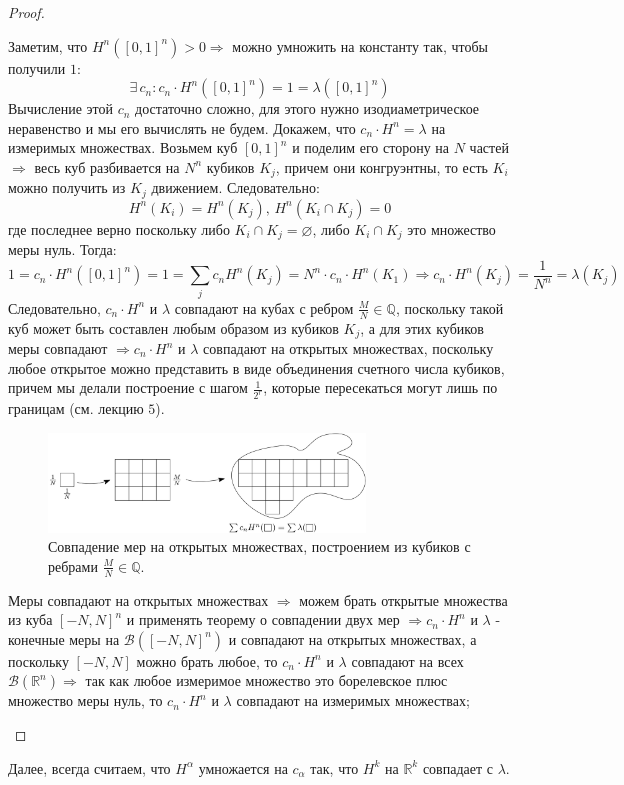 \documentclass[12pt]{article}
\newcommand{\MR}{\mathbb{R}}
\newcommand{\MQ}{\mathbb{Q}}
\newcommand{\MB}{\mathcal{B}}
\newcommand{\VN}{\varnothing}
\theoremstyle{definition}
\newcommand{\ddsum}[2]{\displaystyle\sum\limits_{#1}^{#2}}
\begin{document}
\begin{proof}
\begin{enumerate}[label=\arabic*)]
		Заметим, что $H^n([0,1]^n) > 0 \Rightarrow$ можно умножить на константу так, чтобы получили $1$:
		$$
			\exists\, c_n \colon c_n{\cdot}H^n([0,1]^n) = 1 = \lambda([0,1]^n)
		$$ 
		Вычисление этой $c_n$ достаточно сложно, для этого нужно изодиаметрическое неравенство и мы его вычислять не будем. Докажем, что $c_n{\cdot}H^n = \lambda$ на измеримых множествах. Возьмем куб $[0,1]^n$ и поделим его сторону на $N$ частей $\Rightarrow$ весь куб разбивается на $N^n$ кубиков $K_j$, причем они конгруэнтны, то есть $K_i$ можно получить из $K_j$ движением. Следовательно: 
		$$
			H^n(K_i) = H^n(K_j), \, H^n(K_i \cap K_j) = 0
		$$ 
		где последнее верно поскольку либо $K_i \cap K_j = \VN$, либо $K_i \cap K_j$ это множество меры нуль. Тогда:
		$$
			1 = c_n{\cdot}H^n([0,1]^n) = 1 = \ddsum{j}{}c_nH^n(K_j) = N^n{\cdot}c_n{\cdot}H^n(K_1) \Rightarrow c_n{\cdot}H^n(K_j) = \dfrac{1}{N^n} = \lambda(K_j)
		$$
		Следовательно, $c_n{\cdot}H^n$ и $\lambda$ совпадают на кубах с ребром $\tfrac{M}{N} \in \MQ$, поскольку такой куб может быть составлен любым образом из кубиков $K_j$, а для этих кубиков меры совпадают $\Rightarrow c_n{\cdot}H^n$ и $\lambda$ совпадают на открытых множествах, поскольку любое открытое можно представить в виде объединения счетного числа кубиков, причем мы делали построение с шагом $\tfrac{1}{2^r}$, которые пересекаться могут лишь по границам (см. лекцию $5$). 
		\begin{figure}[H]
			\centering
			\includegraphics[width=0.75\textwidth]{MA4L14_2.png}
			\caption{Совпадение мер на открытых множествах, построением из кубиков с ребрами $\tfrac{M}{N} \in \MQ$.}
			\label{14_2}
		\end{figure}
		Меры совпадают на открытых множествах $\Rightarrow$ можем брать открытые множества из куба $[-N,N]^n$ и применять теорему о совпадении двух мер $\Rightarrow c_n{\cdot}H^n$ и $\lambda$ - конечные меры на $\MB([-N,N]^n)$ и совпадают на открытых множествах, а поскольку $[-N,N]$ можно брать любое, то $c_n{\cdot}H^n$ и $\lambda$ совпадают на всех $\MB(\MR^n) \Rightarrow$ так как любое измеримое множество это борелевское плюс множество меры нуль, то $c_n{\cdot}H^n$ и $\lambda$ совпадают на измеримых множествах;
	\end{enumerate}
\end{proof}
Далее, всегда считаем, что $H^\alpha$ умножается на $c_\alpha$ так, что $H^k$ на $\MR^k$ совпадает с $\lambda$.
\end{document}

